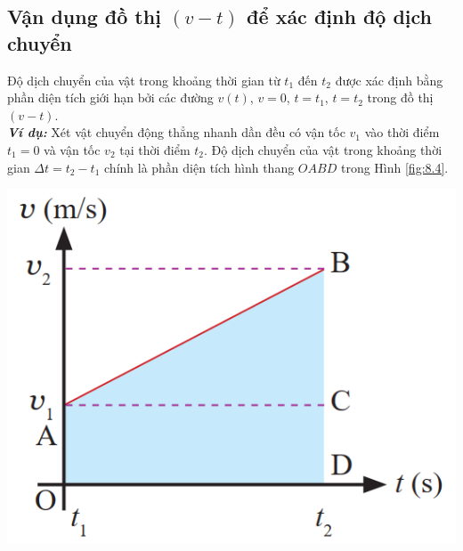 \subsection{Vận dụng đồ thị $(v - t)$ để xác định độ dịch chuyển}
Độ dịch chuyển của vật trong khoảng thời gian từ $t_1$ đến $t_2$ được xác định bằng phần diện tích giới hạn bởi các đường $v\left(t\right)$, $v=0$, $t=t_1$, $t=t_2$ trong đồ thị $\left(v - t\right)$.\\
\textbf{\textit{Ví dụ:}} Xét vật chuyển động thẳng nhanh dần đều có vận tốc $v_1$ vào thời điểm $t_1=0$ và vận tốc $v_2$ tại thời điểm $t_2$. Độ dịch chuyển của vật trong khoảng thời gian $\Delta t= t_2-t_1$ chính là phần diện tích hình thang $OABD$ trong Hình \ref{fig:8.4}.
\begin{center}
	\includegraphics[width=0.3\linewidth]{../figs/VN10-2023-PH-TP008-4}
	\label{fig:8.4}
\end{center}
